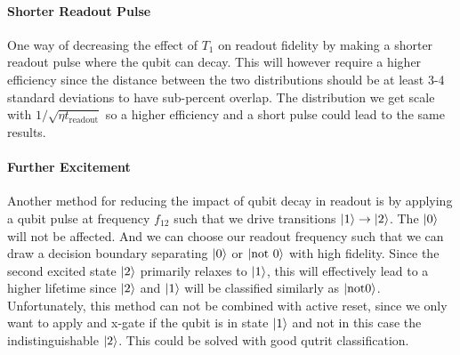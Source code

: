 \paragraph{Shorter Readout Pulse} One way of decreasing the effect of $T_1$ on readout fidelity by making a shorter readout pulse where the qubit can decay. This will however require a higher efficiency since the distance between the two distributions should be at least 3-4 standard deviations to have sub-percent overlap. The distribution we get scale with $1 / \sqrt{\eta t_{\text{readout}}}$ so a higher efficiency and a short pulse could lead to the same results.

\paragraph{Further Excitement} Another method for reducing the impact of qubit decay in readout is by applying a qubit pulse at frequency $f_{12}$ such that we drive transitions $\ket{1}\to\ket{2}$. The $\ket{0}$ will not be affected. And we can choose our readout frequency such that we can draw a decision boundary separating $\ket{0}$ or $\ket{\text{not }0}$ with high fidelity. Since the second excited state $\ket{2}$ primarily relaxes to $\ket{1}$, this will effectively lead to a higher lifetime since $\ket{2}$ and $\ket{1}$ will be classified similarly as $\ket{\text{not} 0}$. Unfortunately, this method can not be combined with active reset, since we only want to apply and x-gate if the qubit is in state $\ket{1}$ and not in this case the indistinguishable $\ket{2}$. This could be solved with good qutrit classification.



